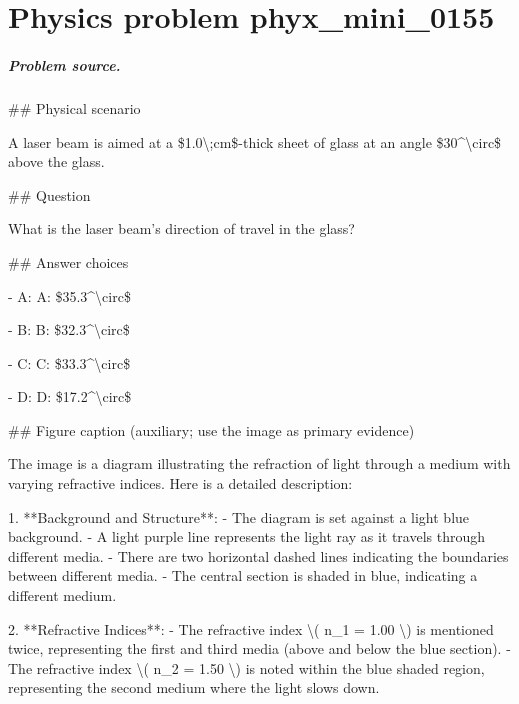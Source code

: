 
\chapter{Physics problem phyx\_mini\_0155}
\label{ch:PhyXMiniProblems_problem_phyx_mini_0155}

\paragraph{Problem source.}
\#\# Physical scenario

A laser beam is aimed at a \$1.0\textbackslash{};cm\$-thick sheet of glass at an angle \$30\textasciicircum{}\textbackslash{}circ\$ above the glass.

\#\# Question

What is the laser beam's direction of travel in the glass?

\#\# Answer choices

- A: A: \$35.3\textasciicircum{}\textbackslash{}circ\$

- B: B: \$32.3\textasciicircum{}\textbackslash{}circ\$

- C: C: \$33.3\textasciicircum{}\textbackslash{}circ\$

- D: D: \$17.2\textasciicircum{}\textbackslash{}circ\$

\#\# Figure caption (auxiliary; use the image as primary evidence)

The image is a diagram illustrating the refraction of light through a medium with varying refractive indices. Here is a detailed description:

1. **Background and Structure**:
   - The diagram is set against a light blue background.
   - A light purple line represents the light ray as it travels through different media.
   - There are two horizontal dashed lines indicating the boundaries between different media. 
   - The central section is shaded in blue, indicating a different medium.

2. **Refractive Indices**:
   - The refractive index \textbackslash{}( n\_1 = 1.00 \textbackslash{}) is mentioned twice, representing the first and third media (above and below the blue section).
   - The refractive index \textbackslash{}( n\_2 = 1.50 \textbackslash{}) is noted within the blue shaded region, representing the second medium where the light slows down.

